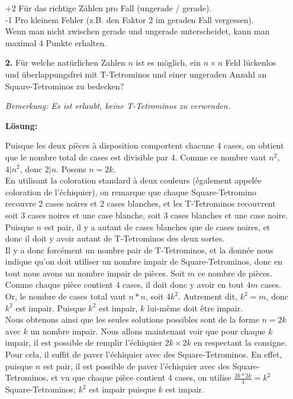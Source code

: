 \documentclass[language=german,style=solution]{smo}
\begin{document}
\begin{enumerate}
+2 Für das richtige Zählen pro Fall (ungerade / gerade).\\
-1 Pro kleinem Fehler (z.B. den Faktor 2 im geraden Fall vergessen).\\
Wenn man nicht zwischen gerade und ungerade unterscheidet, kann man maximal 4 Punkte erhalten. 

\newpage

\item[\textbf{2.}] 
Für welche natürlichen Zahlen $n$ ist es möglich, ein $n\times n$ Feld lückenlos und überlappungsfrei mit T-Tetrominos und einer ungeraden Anzahl an Square-Tetrominos zu bedecken?
\vspace{-0cm}
\begin{center}
\quad
{}
\end{center}
\textit{Bemerkung: Es ist erlaubt, keine T-Tetrominos zu verwenden.}


\textbf{Lösung:}

Puisque les deux pièces à disposition comportent chacune 4 cases, on obtient que le nombre total de cases est divisible par 4. Comme ce nombre vaut $n^2$, $4 | n^2$, donc $2 | n $. Posons $n = 2k$.\\
En utilisant la coloration standard à deux couleurs (également appelée coloration de l'échiquier), on remarque que chaque Square-Tetromino recouvre 2 cases noires et 2 cases blanches, et les T-Tetrominos recouvrent soit 3 cases noires et une case blanche, soit 3 cases blanches et une case noire. Puisque $n$ est pair, il y a autant de cases blanches que de cases noires, et donc il doit y avoir autant de T-Tetrominos des deux sortes.\\
Il y a donc forcément un nombre pair de T-Tetrominos, et la donnée nous indique qu'on doit utiliser un nombre impair de Square-Tetrominos, donc en tout nous avons un nombre impair de pièces. Soit $m$ ce nombre de pièces. Comme chaque pièce contient 4 cases, il doit donc y avoir en tout $4m$ cases. Or, le nombre de cases total vaut $n*n$, soit $4k^2$. Autrement dit, $k^2 = m$, donc $k^2$ est impair. Puisque $k^2$ est impair, $k$ lui-même doit être impair.\\
Nous obtenons ainsi que les seules solutions possibles sont de la forme $n = 2k$ avec $k$ un nombre impair. Nous allons maintenant voir que pour chaque $k$ impair, il est possible de remplir l'échiquier $2k\times 2k$ en respectant la consigne.\\
Pour cela, il suffit de paver l'échiquier avec des Square-Tetrominos. En effet, puisque $n$ est pair, il est possible de paver l'échiquier avec des Square-Tetrominos, et vu que chaque pièce contient 4 cases, on utilise $\frac{2k*2k}{4} = k^2$ Square-Tetrominos; $k^2$ est impair puisque $k$ est impair.


\end{enumerate}
\end{document}
